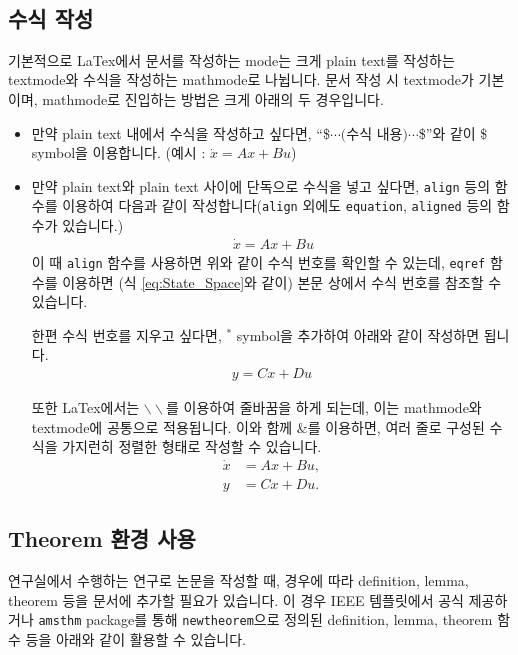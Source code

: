 \documentclass[journal]{IEEEtran}
\begin{document}
\


\subsection{수식 작성}

기본적으로 LaTex에서 문서를 작성하는 mode는 크게 plain text를 작성하는 textmode와 수식을 작성하는 mathmode로 나뉩니다. 
문서 작성 시 textmode가 기본이며, mathmode로 진입하는 방법은 크게 아래의 두 경우입니다.  
\begin{itemize}
    \item 만약 plain text 내에서 수식을 작성하고 싶다면, ``\$$\cdots\text{(수식 내용)}\cdots$\$''와 같이 \$ symbol을 이용합니다. (예시 : $\dot{x} = Ax + Bu$)
    \item 만약 plain text와 plain text 사이에 단독으로 수식을 넣고 싶다면, {\tt align} 등의 함수를 이용하여 다음과 같이 작성합니다({\tt align} 외에도 {\tt equation}, {\tt aligned} 등의 함수가 있습니다.)
    \begin{align}\
        \dot{x} = Ax + Bu
    \end{align}
    이 때 {\tt align} 함수를 사용하면 위와 같이 수식 번호를 확인할 수 있는데, {\tt eqref} 함수를 이용하면 (식 \eqref{eq:State_Space}와 같이) 본문 상에서 수식 번호를 참조할 수 있습니다. 

    한편 수식 번호를 지우고 싶다면, $^*$ symbol을 추가하여 아래와 같이 작성하면 됩니다. 
    \begin{align*}
        y = Cx + Du
    \end{align*}

    또한 LaTex에서는 $\backslash\backslash$를 이용하여 줄바꿈을 하게 되는데, 이는 mathmode와 textmode에 공통으로 적용됩니다. 
    이와 함께 \&를 이용하면, 여러 줄로 구성된 수식을 가지런히 정렬한 형태로 작성할 수 있습니다.
    \begin{align}
        \dot{x} & = A x + B u,\\
        y & = C x + D u.
    \end{align}

\end{itemize}
 


\subsection{Theorem 환경 사용}

연구실에서 수행하는 연구로 논문을 작성할 때, 경우에 따라 definition, lemma, theorem 등을 문서에 추가할 필요가 있습니다. 
이 경우 IEEE 템플릿에서 공식 제공하거나 {\tt amsthm} package를 통해 {\tt newtheorem}으로 정의된 definition, lemma, theorem 함수 등을 아래와 같이 활용할 수 있습니다. 
\end{document}
